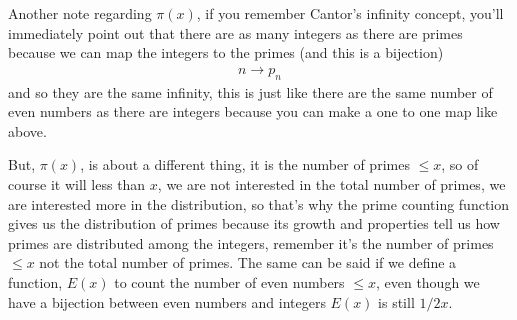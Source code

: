 \documentclass[aps,preprint,preprintnumbers,nofootinbib,showpacs,prd]{revtex4-1}
\newcommand{\nbea}{\begin{eqnarray*}}
\newcommand{\neea}{\end{eqnarray*}}
\begin{document}
Another note regarding $\pi(x)$, if you remember Cantor's infinity concept, you'll immediately point out that there are as many integers as there are primes because we can map the integers to the primes (and this is a bijection)
%
\nbea
n \to p_n
\neea
%
and so they are the same infinity, this is just like there are the same number of even numbers as there are integers because you can make a one to one map like above.

But, $\pi(x)$, is about a different thing, it is the number of primes $\le x$, so of course it will less than $x$, we are not interested in the total number of primes, we are interested more in the distribution, so that's why the prime counting function gives us the distribution of primes because its growth and properties tell us how primes are distributed among the integers, remember it's the number of primes $\le x$ not the total number of primes. The same can be said if we define a function, $E(x)$ to count the number of even numbers $\le x$, even though we have a bijection between even numbers and integers $E(x)$ is still $1/2 x$.
\end{document}
